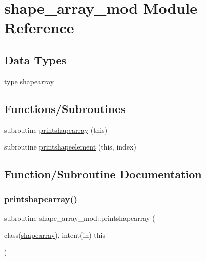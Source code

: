\hypertarget{namespaceshape__array__mod}{}\section{shape\+\_\+array\+\_\+mod Module Reference}
\label{namespaceshape__array__mod}
\subsection*{Data Types}
\begin{DoxyCompactItemize}
\item 
type \hyperlink{structshape__array__mod_1_1shapearray}{shapearray}
\end{DoxyCompactItemize}
\subsection*{Functions/\+Subroutines}
\begin{DoxyCompactItemize}
\item 
subroutine \hyperlink{namespaceshape__array__mod_a7b3e08e575b74d321d61ffaea85c2895}{printshapearray} (this)
\item 
subroutine \hyperlink{namespaceshape__array__mod_a21045b79e1718e47bd933ce6181ee7fd}{printshapeelement} (this, index)
\end{DoxyCompactItemize}


\subsection{Function/\+Subroutine Documentation}
\mbox{\label{namespaceshape__array__mod_a7b3e08e575b74d321d61ffaea85c2895}} 
\subsubsection{\texorpdfstring{printshapearray()}{printshapearray()}}
{\footnotesize\ttfamily subroutine shape\+\_\+array\+\_\+mod\+::printshapearray (\begin{DoxyParamCaption}\item[{class(\hyperlink{structshape__array__mod_1_1shapearray}{shapearray}), intent(in)}]{this }\end{DoxyParamCaption})\hspace{0.3cm}{\ttfamily [private]}}



